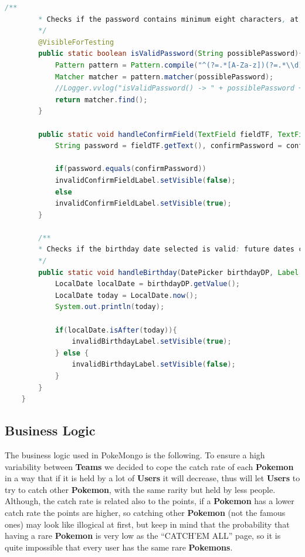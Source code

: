 \begin{lstlisting}[language=Java]
		/**
		* Checks if the password contains minimum eight characters, at least one letter and one number.
		*/
		@VisibleForTesting
		public static boolean isValidPassword(String possiblePassword){
			Pattern pattern = Pattern.compile("^(?=.*[A-Za-z])(?=.*\\d)[A-Za-z\\d]{8,}$");
			Matcher matcher = pattern.matcher(possiblePassword);
			//Logger.vvlog("isValidPassword() -> " + possiblePassword + (matcher.find() ? "-> V" : "-> X"));
			return matcher.find();
		}
		
		public static void handleConfirmField(TextField fieldTF, TextField confirmFieldTF, Label invalidConfirmFieldLabel){
			String password = fieldTF.getText(), confirmPassword = confirmFieldTF.getText();
			
			if(password.equals(confirmPassword))
			invalidConfirmFieldLabel.setVisible(false);
			else
			invalidConfirmFieldLabel.setVisible(true);
		}
		
		/**
		* Checks if the birthday date selected is valid: future dates cannot be picked
		*/
		public static void handleBirthday(DatePicker birthdayDP, Label invalidBirthdayLabel){
			LocalDate localDate = birthdayDP.getValue();
			LocalDate today = LocalDate.now();
			System.out.println(today);
			
			if(localDate.isAfter(today)){
				invalidBirthdayLabel.setVisible(true);
			} else {
				invalidBirthdayLabel.setVisible(false);
			}
		}
	}
\end{lstlisting}

\subsection{Business Logic}
The business logic used in PokeMongo is the following. To ensure a high variability between \textbf{Teams} we decided to cope the catch rate of each \textbf{Pokemon} in a way that if it is held by a lot of \textbf{Users} it will decrease, thus will let \textbf{Users} to try to catch other \textbf{Pokemon}, with the same rarity but held by less people. Although, the catch rate is related also to the points, if a \textbf{Pokemon} has a lower catch rate the points are higher, so catching other \textbf{Pokemon} (not the famous ones) may look like illogical at first, but keep in mind that the probability that having a rare \textbf{Pokemon} is very low as the “CATCH’EM ALL” page, so it is quite impossible that every user has the same rare \textbf{Pokemons}.
